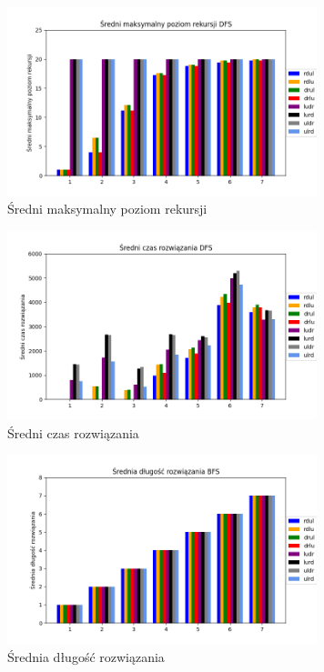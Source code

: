 \documentclass{classrep}
\begin{document}
{        \begin{figure}[!htbp]
             \centering
             \includegraphics[width=\textwidth, height=55mm]{wykresy/dfs4.png}
             \caption{Średni maksymalny poziom rekursji}
        \end{figure}

        \begin{figure}[!htbp]
            \centering
            \includegraphics[width=\textwidth, height=55mm]{wykresy/dfs5.png}
            \caption{Średni czas rozwiązania}
        \end{figure}
        \FloatBarrier

        

        \begin{figure}[!htbp]
            \centering
            \includegraphics[width=\textwidth, height=55mm]{wykresy/bfs1.png}
            \caption{Średnia długość rozwiązania}
        \end{figure}

}
\end{document}
